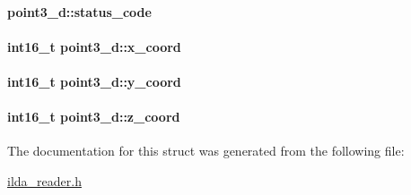 \paragraph[{\texorpdfstring{status\+\_\+code}{status_code}}]{ point3\+\_\+d\+::status\+\_\+code}\hypertarget{structpoint3__d_ac46953a940fbb65ffed780bcb5ac2ecc}{}\label{structpoint3__d_ac46953a940fbb65ffed780bcb5ac2ecc}
\paragraph[{\texorpdfstring{x\+\_\+coord}{x_coord}}]{\setlength{\rightskip}{0pt plus 5cm}int16\+\_\+t point3\+\_\+d\+::x\+\_\+coord}\hypertarget{structpoint3__d_a82eab6ff9df48322e3252c6556db05e3}{}\label{structpoint3__d_a82eab6ff9df48322e3252c6556db05e3}
\paragraph[{\texorpdfstring{y\+\_\+coord}{y_coord}}]{\setlength{\rightskip}{0pt plus 5cm}int16\+\_\+t point3\+\_\+d\+::y\+\_\+coord}\hypertarget{structpoint3__d_a1ccb895cc6619f81c02aec641282ebcb}{}\label{structpoint3__d_a1ccb895cc6619f81c02aec641282ebcb}
\paragraph[{\texorpdfstring{z\+\_\+coord}{z_coord}}]{\setlength{\rightskip}{0pt plus 5cm}int16\+\_\+t point3\+\_\+d\+::z\+\_\+coord}\hypertarget{structpoint3__d_acf2babaff2830180190d111c8958f6af}{}\label{structpoint3__d_acf2babaff2830180190d111c8958f6af}


The documentation for this struct was generated from the following file\+:\begin{DoxyCompactItemize}
\item 
\hyperlink{ilda__reader_8h}{ilda\+\_\+reader.\+h}\end{DoxyCompactItemize}
